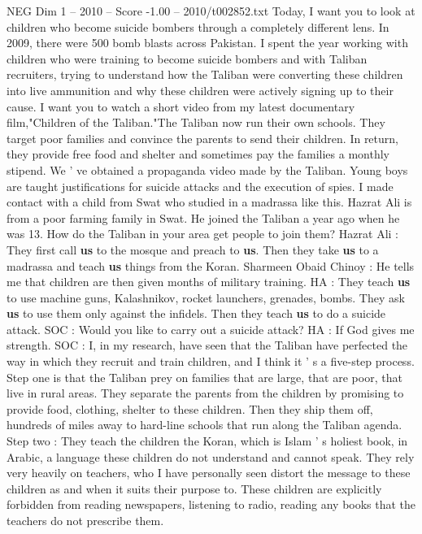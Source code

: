 \begin{textsample}{NEG Dim 1 – 2010 – Score -1.00 – 2010/t002852.txt}  \label{ex:f1_neg_055}
Today, I want you to look at children who become suicide bombers through a completely different lens.
In 2009, there were 500 bomb blasts across Pakistan.
I spent the year working with children who were training to become suicide bombers and with Taliban recruiters, trying to understand how the Taliban were converting these children into live ammunition and why these children were actively signing up to their cause.
I want you to watch a short video from my latest documentary film,"Children of the Taliban."The Taliban now run their own schools.
They target poor families and convince the parents to send their children.
In return, they provide free food and shelter and sometimes pay the families a monthly stipend.
We ' ve obtained a propaganda video made by the Taliban.
Young boys are taught justifications for suicide attacks and the execution of spies.
I made contact with a child from Swat who studied in a madrassa like this.
Hazrat Ali is from a poor farming family in Swat.
He joined the Taliban a year ago when he was 13.
How do the Taliban in your area get people to join them?
Hazrat Ali : They first call \textbf{us} to the mosque and preach to \textbf{us}.
Then they take \textbf{us} to a madrassa and teach \textbf{us} things from the Koran.
Sharmeen Obaid Chinoy : He tells me that children are then given months of military training.
HA : They teach \textbf{us} to use machine guns, Kalashnikov, rocket launchers, grenades, bombs.
They ask \textbf{us} to use them only against the infidels.
Then they teach \textbf{us} to do a suicide attack.
SOC : Would you like to carry out a suicide attack?
HA : If God gives me strength.
SOC : I, in my research, have seen that the Taliban have perfected the way in which they recruit and train children, and I think it ' s a five-step process.
Step one is that the Taliban prey on families that are large, that are poor, that live in rural areas.
They separate the parents from the children by promising to provide food, clothing, shelter to these children.
Then they ship them off, hundreds of miles away to hard-line schools that run along the Taliban agenda.
Step two : They teach the children the Koran, which is Islam ' s holiest book, in Arabic, a language these children do not understand and cannot speak.
They rely very heavily on teachers, who I have personally seen distort the message to these children as and when it suits their purpose to.
These children are explicitly forbidden from reading newspapers, listening to radio, reading any books that the teachers do not prescribe them.

\end{textsample}

